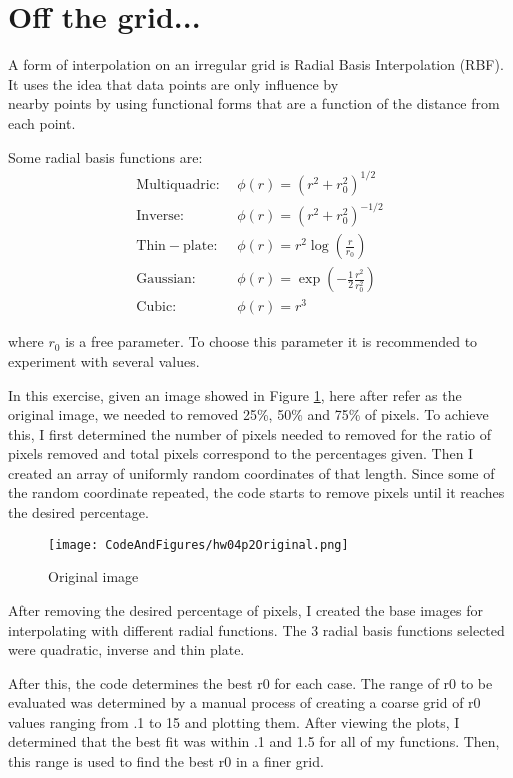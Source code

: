 \section{Off the grid...}

A form of interpolation on an irregular grid is Radial Basis Interpolation (RBF). It uses the idea that data points are only influence by \\
nearby points by using functional forms that are a function of the distance from each point. 

Some radial basis functions are:
\begin{align}
\mathrm{Multiquadric:}\; &\phi(r)= (r^2 + r_0^2)^{1/2} \\
\mathrm{Inverse:}\;&\phi(r)= (r^2 + r_0^2)^{-1/2} \\
\mathrm{Thin-plate:}\;&\phi(r)= r^2 \log\left(\frac{r}{r_0}\right) \\
\mathrm{Gaussian:}\;&\phi(r) = \exp\left(-\frac{1}{2}\frac{r^2}{r^2_0}\right)\\
\mathrm{Cubic:}\; &\phi(r)=r^3
\end{align}

where $r_0$ is a free parameter. To choose this parameter it is recommended to experiment with several values. 

In this exercise, given an image showed in Figure \ref{fig:p2Orig}, here after refer as the original image, we needed to removed 25\%, 50\% and 75\% of pixels. To achieve this, I first determined the number of pixels needed to removed for the ratio of pixels removed and total pixels correspond to the percentages given. Then I created an array of uniformly random coordinates of that length. Since some of the random coordinate repeated, the code starts to remove pixels until it reaches the desired percentage.

\begin{figure}
    \centering
    \texttt{[image: CodeAndFigures/hw04p2Original.png]}
    \caption{Original image}
    \label{fig:p2Orig}
\end{figure}

After removing the desired percentage of pixels, I created the base images for interpolating with different radial functions. The 3 radial basis functions selected were quadratic, inverse and thin plate. 

After this, the code determines the best r0 for each case. The range of r0 to be evaluated was determined by a manual process of creating a coarse grid of r0 values ranging from .1 to 15 and plotting them. After viewing the plots, I determined that the best fit was within .1 and 1.5 for all of my functions. Then, this range is used to find the best r0 in a finer grid.

